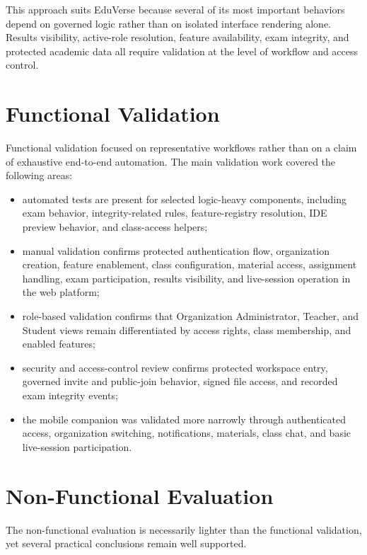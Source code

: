 This approach suits EduVerse because several of its most important behaviors
depend on governed logic rather than on isolated interface rendering alone.
Results visibility, active-role resolution, feature availability, exam
integrity, and protected academic data all require validation at the level of
workflow and access control.

\section{Functional Validation}\label{sec:functional_validation}

Functional validation focused on representative workflows rather than on a
claim of exhaustive end-to-end automation. The main validation work covered the
following areas:

\begin{itemize}
  \item automated tests are present for selected logic-heavy components,
    including exam behavior, integrity-related rules, feature-registry
    resolution, IDE preview behavior, and class-access helpers;
  \item manual validation confirms protected authentication flow, organization
    creation, feature enablement, class configuration, material access,
    assignment handling, exam participation, results visibility, and live-session
    operation in the web platform;
  \item role-based validation confirms that Organization Administrator,
    Teacher, and Student views remain differentiated by access rights, class
    membership, and enabled features;
  \item security and access-control review confirms protected workspace entry,
    governed invite and public-join behavior, signed file access, and recorded
    exam integrity events;
  \item the mobile companion was validated more narrowly through authenticated
    access, organization switching, notifications, materials, class chat, and
    basic live-session participation.
\end{itemize}

\section{Non-Functional Evaluation}\label{sec:non_functional_evaluation}

The non-functional evaluation is necessarily lighter than the functional validation,
yet several practical conclusions remain well supported.


